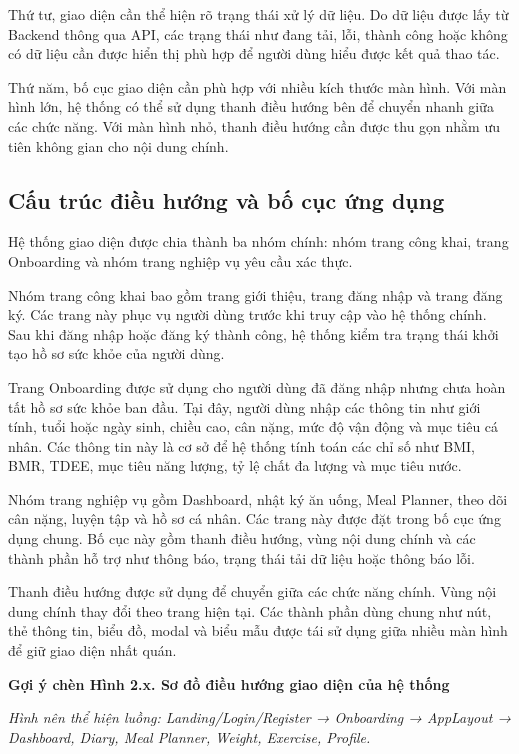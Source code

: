 \documentclass[12pt, a4paper]{report}
\begin{document}
Thứ tư, giao diện cần thể hiện rõ trạng thái xử lý dữ liệu. Do dữ liệu được lấy từ Backend thông qua API, các trạng thái như đang tải, lỗi, thành công hoặc không có dữ liệu cần được hiển thị phù hợp để người dùng hiểu được kết quả thao tác.

Thứ năm, bố cục giao diện cần phù hợp với nhiều kích thước màn hình. Với màn hình lớn, hệ thống có thể sử dụng thanh điều hướng bên để chuyển nhanh giữa các chức năng. Với màn hình nhỏ, thanh điều hướng cần được thu gọn nhằm ưu tiên không gian cho nội dung chính.

\subsection{Cấu trúc điều hướng và bố cục ứng dụng}Hệ thống giao diện được chia thành ba nhóm chính: nhóm trang công khai, trang Onboarding và nhóm trang nghiệp vụ yêu cầu xác thực.

Nhóm trang công khai bao gồm trang giới thiệu, trang đăng nhập và trang đăng ký. Các trang này phục vụ người dùng trước khi truy cập vào hệ thống chính. Sau khi đăng nhập hoặc đăng ký thành công, hệ thống kiểm tra trạng thái khởi tạo hồ sơ sức khỏe của người dùng.

Trang Onboarding được sử dụng cho người dùng đã đăng nhập nhưng chưa hoàn tất hồ sơ sức khỏe ban đầu. Tại đây, người dùng nhập các thông tin như giới tính, tuổi hoặc ngày sinh, chiều cao, cân nặng, mức độ vận động và mục tiêu cá nhân. Các thông tin này là cơ sở để hệ thống tính toán các chỉ số như BMI, BMR, TDEE, mục tiêu năng lượng, tỷ lệ chất đa lượng và mục tiêu nước.

Nhóm trang nghiệp vụ gồm Dashboard, nhật ký ăn uống, Meal Planner, theo dõi cân nặng, luyện tập và hồ sơ cá nhân. Các trang này được đặt trong bố cục ứng dụng chung. Bố cục này gồm thanh điều hướng, vùng nội dung chính và các thành phần hỗ trợ như thông báo, trạng thái tải dữ liệu hoặc thông báo lỗi.

Thanh điều hướng được sử dụng để chuyển giữa các chức năng chính. Vùng nội dung chính thay đổi theo trang hiện tại. Các thành phần dùng chung như nút, thẻ thông tin, biểu đồ, modal và biểu mẫu được tái sử dụng giữa nhiều màn hình để giữ giao diện nhất quán.

\textbf{Gợi ý chèn Hình 2.x. Sơ đồ điều hướng giao diện của hệ thống}

\textit{Hình nên thể hiện luồng: Landing/Login/Register → Onboarding → AppLayout → Dashboard, Diary, Meal Planner, Weight, Exercise, Profile.}
\end{document}
